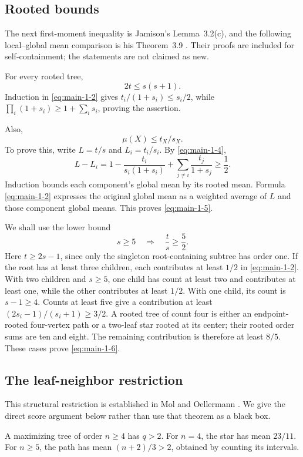 \documentclass[11pt,reqno]{amsart}
\theoremstyle{plain}
\begin{document}
\subsection{Rooted bounds}\label{rooted-bounds}
The next first-moment inequality is Jamison's Lemma~3.2(c), and the following local--global mean comparison is his Theorem~3.9 \cite{Jamison1983}. Their proofs are included for self-containment; the statements are not claimed as new.


For every rooted tree, \[
2t\le s(s+1).
\tag{1.4}\label{eq:main-1-4}
\] Induction in \eqref{eq:main-1-2} gives \(t_i/(1+s_i)\le s_i/2\), while \(\prod_i(1+s_i)\ge1+\sum_i s_i\), proving the assertion.

Also, \[
\mu(X)\le t_X/s_X.
\tag{1.5}\label{eq:main-1-5}
\] To prove this, write \(L=t/s\) and \(L_i=t_i/s_i\). By \eqref{eq:main-1-4}, \[
L-L_i
=1-\frac{t_i}{s_i(1+s_i)}
 +\sum_{j\ne i}\frac{t_j}{1+s_j}\ge\frac12.
\] Induction bounds each component's global mean by its rooted mean. Formula \eqref{eq:main-1-2} expresses the original global mean as a weighted average of \(L\) and those component global means. This proves \eqref{eq:main-1-5}.

We shall use the lower bound \[
s\ge5\quad\Longrightarrow\quad \frac ts\ge\frac52.
\tag{1.6}\label{eq:main-1-6}
\] Here \(t\ge2s-1\), since only the singleton root-containing subtree has order one. If the root has at least three children, each contributes at least \(1/2\) in \eqref{eq:main-1-2}. With two children and \(s\ge5\), one child has count at least two and contributes at least one, while the other contributes at least \(1/2\). With one child, its count is \(s-1\ge4\). Counts at least five give a contribution at least \((2s_i-1)/(s_i+1)\ge3/2\). A rooted tree of count four is either an endpoint-rooted four-vertex path or a two-leaf star rooted at its center; their rooted order sums are ten and eight. The remaining contribution is therefore at least \(8/5\). These cases prove \eqref{eq:main-1-6}.

\subsection{The leaf-neighbor restriction}\label{the-leaf-neighbor-restriction}
This structural restriction is established in Mol and Oellermann \cite[Theorem~3.9]{MolOellermann2019}. We give the direct score argument below rather than use that theorem as a black box.


A maximizing tree of order \(n\ge4\) has \(q>2\). For \(n=4\), the star has mean \(23/11\). For \(n\ge5\), the path has mean \((n+2)/3>2\), obtained by counting its intervals.
\end{document}
